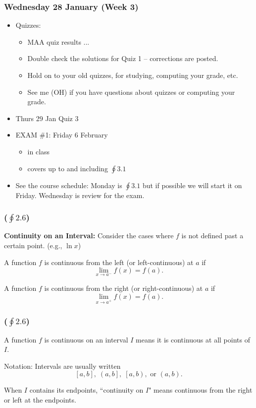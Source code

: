 \documentclass[14pt]{beamer}
\begin{document}

\begin{frame}
\frametitle{Wednesday 28 January (Week 3)}
\footnotesize
\begin{itemize}
\item Quizzes: 
	\begin{itemize}
	\footnotesize
	\item MAA quiz results ...
	\item Double check the solutions for Quiz 1 -- corrections are posted.
	\item Hold on to your old quizzes, for studying, computing your grade, etc.
	\item See me (OH) if you have questions about quizzes or computing your grade.
	\end{itemize}
\item Thurs 29 Jan Quiz 3 
\item EXAM \#1: Friday 6 February 
	\begin{itemize}
	\footnotesize
	\item in class
	\item covers up to and including $\oint 3.1$
	\end{itemize}
\item See the course schedule: Monday is $\oint 3.1$ but if possible we will start it on Friday.  Wednesday is review for the exam.	
\end{itemize}
\end{frame}

\begin{frame}
\frametitle{($\oint 2.6$)}
\small
{\bf Continuity on an Interval:} Consider the cases where $f$ is not defined past a certain point.  (e.g., $\ln x$)

\vspace{1pc}
A function $f$ is continuous from the left (or left-continuous) at $a$ if
\[\lim_{x \to a^-} f(x)=f(a).\]

\vspace{0.5pc}
A function $f$ is continuous from the right (or right-continuous) at $a$ if
\[\lim_{x \to a^+} f(x)=f(a).\]
\end{frame}

\begin{frame}
\frametitle{($\oint 2.6$)}
A function $f$ is \alert{continuous on an interval $I$} means it is continuous at all points of $I$.  

\vspace{1.5pc}
Notation: Intervals are usually written 
\[\left[a,b\right],\;\left(a,b\right],\;\left[a,b\right),\text{ or }\left(a,b\right).\]

\vspace{1pc}
When $I$ contains its endpoints, ``continuity on $I$" means continuous from the right or left at the endpoints.
\end{frame}
\end{document}
